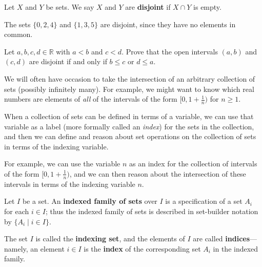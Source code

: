 
\begin{definition}
\label{defDisjoint}
Let $X$ and $Y$ be sets. We say $X$ and $Y$ are \textbf{disjoint} if $X \cap Y$ is empty.
\end{definition}

\begin{example}
The sets $\{ 0,2,4 \}$ and $\{ 1,3,5 \}$ are disjoint, since they have no elements in common.
\end{example}

\begin{exercise}
Let $a,b,c,d \in \mathbb{R}$ with $a<b$ and $c<d$. Prove that the open intervals $(a,b)$ and $(c,d)$ are disjoint if and only if $b \le c$ or $d \le a$.
\end{exercise}


We will often have occasion to take the intersection of an arbitrary collection of sets (possibly infinitely many). For example, we might want to know which real numbers are elements of \textit{all} of the intervals of the form $[0, 1+\frac{1}{n})$ for $n \ge 1$.

When a collection of sets can be defined in terms of a variable, we can use that variable as a label (more formally called an \textit{index}) for the sets in the collection, and then we can define and reason about set operations on the collection of sets in terms of the indexing variable.

For example, we can use the variable $n$ as an index for the collection of intervals of the form $[0,1+\frac{1}{n})$, and we can then reason about the intersection of these intervals in terms of the indexing variable $n$.

\begin{definition}
\label{defIndexedFamily}
Let $I$ be a set. An \textbf{indexed family of sets} over $I$ is a specification of a set $A_i$ for each $i \in I$; thus the indexed family of sets is described in set-builder notation by $\{ A_i \mid i \in I \}$.

The set $I$ is called the \textbf{indexing set}, and the elements of $I$ are called \textbf{indices}---namely, an element $i \in I$ is the \textbf{index} of the corresponding set $A_i$ in the indexed family.
\end{definition}

